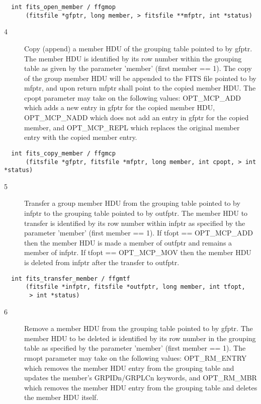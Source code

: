 \documentclass[11pt]{book}
\begin{document}
\begin{verbatim}
  int fits_open_member / ffgmop
      (fitsfile *gfptr, long member, > fitsfile **mfptr, int *status)
\end{verbatim}

\begin{description}
\item[4 ]Copy (append) a member HDU of the grouping table pointed to by gfptr.
   The member HDU is identified by its row number within the grouping table
   as given by the parameter 'member' (first member == 1). The copy of the
   group member HDU will be appended to the FITS file pointed to by mfptr,
   and upon return mfptr shall point to the copied member HDU. The cpopt
   parameter may take on the following values: OPT\_MCP\_ADD which adds a new
   entry in gfptr for the copied member HDU, OPT\_MCP\_NADD which does not add
   an entry in gfptr for the copied member, and OPT\_MCP\_REPL which replaces
  the original member entry with the copied member entry. \label{ffgmcp}
\end{description}

\begin{verbatim}
  int fits_copy_member / ffgmcp
      (fitsfile *gfptr, fitsfile *mfptr, long member, int cpopt, > int *status)
\end{verbatim}

\begin{description}
\item[5 ]Transfer a group member HDU from the grouping table pointed to by
   infptr to the grouping table pointed to by outfptr. The member HDU to
   transfer is identified by its row number within infptr as specified by
   the parameter 'member' (first member == 1). If tfopt == OPT\_MCP\_ADD then
   the member HDU is made
   a member of outfptr and remains a member of infptr. If tfopt == OPT\_MCP\_MOV
  then the member HDU is deleted from infptr after the transfer to outfptr. \label{ffgmtf}
\end{description}

\begin{verbatim}
  int fits_transfer_member / ffgmtf
      (fitsfile *infptr, fitsfile *outfptr, long member, int tfopt,
       > int *status)
\end{verbatim}

\begin{description}
\item[6 ]Remove a member HDU from the grouping table pointed to by gfptr. The
   member HDU to be deleted is identified by its row number in the grouping
   table as specified by the parameter 'member' (first member == 1). The rmopt
   parameter may take on the following values: OPT\_RM\_ENTRY which
   removes the member HDU entry from the grouping table and updates the
   member's GRPIDn/GRPLCn keywords, and OPT\_RM\_MBR which removes the member
  HDU entry from the grouping table and deletes the member HDU itself. \label{ffgmrm}
\end{description}
\end{document}
